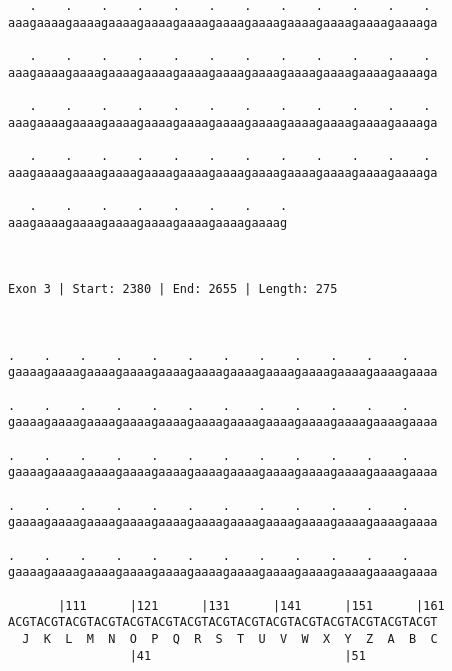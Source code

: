 \documentclass{article}
\begin{document}
\begin{Verbatim}
   .    .    .    .    .    .    .    .    .    .    .    . 
aaagaaaagaaaagaaaagaaaagaaaagaaaagaaaagaaaagaaaagaaaagaaaaga
                                                            
   .    .    .    .    .    .    .    .    .    .    .    . 
aaagaaaagaaaagaaaagaaaagaaaagaaaagaaaagaaaagaaaagaaaagaaaaga
                                                            
   .    .    .    .    .    .    .    .    .    .    .    . 
aaagaaaagaaaagaaaagaaaagaaaagaaaagaaaagaaaagaaaagaaaagaaaaga
                                                            
   .    .    .    .    .    .    .    .    .    .    .    . 
aaagaaaagaaaagaaaagaaaagaaaagaaaagaaaagaaaagaaaagaaaagaaaaga
                                                            
   .    .    .    .    .    .    .    .
aaagaaaagaaaagaaaagaaaagaaaagaaaagaaaag
                                       
                                       
 
Exon 3 | Start: 2380 | End: 2655 | Length: 275



.    .    .    .    .    .    .    .    .    .    .    .    
gaaaagaaaagaaaagaaaagaaaagaaaagaaaagaaaagaaaagaaaagaaaagaaaa
                                                            
.    .    .    .    .    .    .    .    .    .    .    .    
gaaaagaaaagaaaagaaaagaaaagaaaagaaaagaaaagaaaagaaaagaaaagaaaa
                                                            
.    .    .    .    .    .    .    .    .    .    .    .    
gaaaagaaaagaaaagaaaagaaaagaaaagaaaagaaaagaaaagaaaagaaaagaaaa
                                                            
.    .    .    .    .    .    .    .    .    .    .    .    
gaaaagaaaagaaaagaaaagaaaagaaaagaaaagaaaagaaaagaaaagaaaagaaaa
                                                            
.    .    .    .    .    .    .    .    .    .    .    .    
gaaaagaaaagaaaagaaaagaaaagaaaagaaaagaaaagaaaagaaaagaaaagaaaa
                                                            
       |111      |121      |131      |141      |151      |161
ACGTACGTACGTACGTACGTACGTACGTACGTACGTACGTACGTACGTACGTACGTACGT
  J  K  L  M  N  O  P  Q  R  S  T  U  V  W  X  Y  Z  A  B  C
                 |41                           |51          
  

\end{Verbatim}
\end{document}
